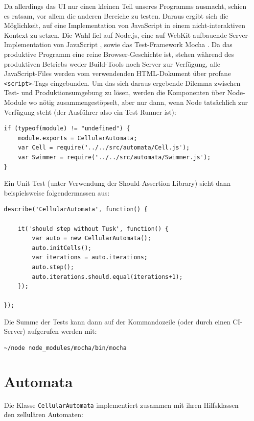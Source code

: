 \documentclass[11pt]{report} %
\theoremstyle{definition}
\begin{document}
Da allerdings das UI nur einen kleinen Teil unseres Programms ausmacht, schien es ratsam, vor allem die anderen Bereiche zu testen. Daraus ergibt sich die Möglichkeit, auf eine Implementation von JavaScript in einem nicht-interaktiven Kontext zu setzen. Die Wahl fiel auf Node.js, eine auf WebKit aufbauende Server-Implementation von JavaScript \cite{Node}, sowie das Test-Framework Mocha \cite{Mocha}.
Da das produktive Programm eine reine Browser-Geschichte ist, stehen während des produktiven Betriebs weder Build-Tools noch Server zur Verfügung, alle JavaScript-Files werden vom verwendenden HTML-Dokument über profane {\tt <script>}-Tags eingebunden.
Um das sich daraus ergebende Dilemma zwischen Test- und Produktionsumgebung zu lösen, werden die Komponenten über Node-Module wo nötig zusammengestöpselt, aber nur dann, wenn Node tatsächlich zur Verfügung steht (der Ausführer also ein Test Runner ist):

\begin{lstlisting}
if (typeof(module) != "undefined") {
	module.exports = CellularAutomata;
	var Cell = require('../../src/automata/Cell.js');
	var Swimmer = require('../../src/automata/Swimmer.js');
}
\end{lstlisting}

Ein Unit Test (unter Verwendung der Should-Assertion Library) sieht dann beispielsweise folgendermassen aus:

\begin{lstlisting}
describe('CellularAutomata', function() {

	it('should step without Tusk', function() {
		var auto = new CellularAutomata();
		auto.initCells();
		var iterations = auto.iterations;
		auto.step();
		auto.iterations.should.equal(iterations+1);
	});

});
\end{lstlisting}

Die Summe der Tests kann dann auf der Kommandozeile (oder durch einen CI-Server) aufgerufen werden mit:
\begin{verbatim}
~/node node_modules/mocha/bin/mocha
\end{verbatim}

\section{Automata}

Die Klasse {\tt CellularAutomata} implementiert zusammen mit ihren Hilfsklassen den zellulären Automaten:
\end{document}
